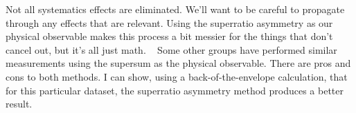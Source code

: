 Not all systematics effects are eliminated.  We'll want to be careful to propagate through any effects that are relevant.  Using the superratio asymmetry as our physical observable makes this process a bit messier for the things that don't cancel out, but it's all just math.
~
Some other groups have performed similar measurements using the supersum as the physical observable.  There are pros and cons to both methods.  I can show, using a back-of-the-envelope calculation, that for this particular dataset, the superratio asymmetry method produces a better result.  

